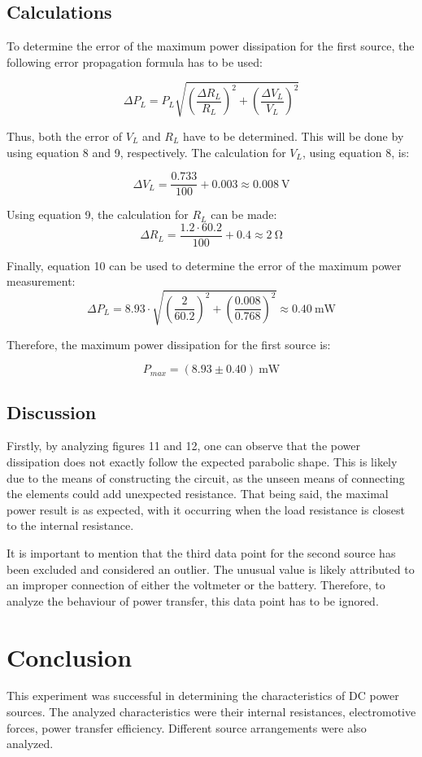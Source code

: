 \documentclass[a4paper]{article}
\newcommand{\unit}[1]{~\mathrm{#1}}
\begin{document}
\subsection{Calculations}
To determine the error of the maximum power dissipation for the first source,
the following error propagation formula has to be used:

\begin{equation}
    \Delta P_L = P_L\sqrt{\left(\frac{\Delta R_L}{R_L}\right) ^2 + \left( \frac{\Delta V_L}{V_L}\right) ^2}
\end{equation}

Thus, both the error of $V_L$ and $R_L$ have to be determined. This will be done
by using equation 8 and 9, respectively. The calculation for $V_L$, using
equation 8, is:

\[\Delta V_L = \frac{0.733}{100} + 0.003 \approx 0.008 \unit{V}\]

Using equation 9, the calculation for $R_L$ can be made:
\[\Delta R_L = \frac{1.2\cdot 60.2}{100} + 0.4 \approx 2\unit{\Omega}\]

Finally, equation 10 can be used to determine the error of the maximum power
measurement:
\[\Delta P_L = 8.93\cdot \sqrt{\left(\frac{2}{60.2}\right ) ^2 + \left(
\frac{0.008}{0.768} \right) ^2} \approx 0.40\unit{mW}\]

Therefore, the maximum power dissipation for the first source is:

\[P_{max} = (8.93 \pm 0.40)\unit{mW}\]

\subsection{Discussion}
Firstly, by analyzing figures 11 and 12, one can observe that the power
dissipation does not exactly follow the expected parabolic shape. This is likely
due to the means of constructing the circuit, as the unseen means of connecting
the elements could add unexpected resistance. That being said, the maximal power
result is as expected, with it occurring when the load resistance is closest to
the internal resistance. 

It is important to mention that the third data point for the second source has
been excluded and considered an outlier. The unusual value is likely attributed
to an improper connection of either the voltmeter or the battery. Therefore, to
analyze the behaviour of power transfer, this data point has to be ignored.

\section{Conclusion}
This experiment was successful in determining the characteristics of DC power
sources. The analyzed characteristics were their internal resistances,
electromotive forces, power transfer efficiency. Different source arrangements
were also analyzed. 
\end{document}
